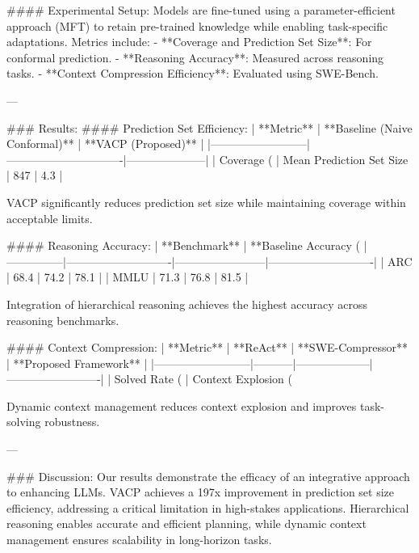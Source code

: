 #### Experimental Setup:
Models are fine-tuned using a parameter-efficient approach (MFT) to retain pre-trained knowledge while enabling task-specific adaptations. Metrics include:
- **Coverage and Prediction Set Size**: For conformal prediction.
- **Reasoning Accuracy**: Measured across reasoning tasks.
- **Context Compression Efficiency**: Evaluated using SWE-Bench.

---

### Results:
#### Prediction Set Efficiency:
| **Metric**               | **Baseline (Naive Conformal)** | **VACP (Proposed)** |
|--------------------------|-------------------------------|---------------------|
| Coverage (%
| Mean Prediction Set Size | 847                           | 4.3                |

VACP significantly reduces prediction set size while maintaining coverage within acceptable limits.

#### Reasoning Accuracy:
| **Benchmark** | **Baseline Accuracy (%
|---------------|----------------------------|------------------------|----------------------------|
| ARC           | 68.4                       | 74.2                   | 78.1                       |
| MMLU          | 71.3                       | 76.8                   | 81.5                       |

Integration of hierarchical reasoning achieves the highest accuracy across reasoning benchmarks.

#### Context Compression:
| **Metric**              | **ReAct** | **SWE-Compressor** | **Proposed Framework** |
|--------------------------|-----------|--------------------|-------------------------|
| Solved Rate (%
| Context Explosion (%

Dynamic context management reduces context explosion and improves task-solving robustness.

---

### Discussion:
Our results demonstrate the efficacy of an integrative approach to enhancing LLMs. VACP achieves a 197x improvement in prediction set size efficiency, addressing a critical limitation in high-stakes applications. Hierarchical reasoning enables accurate and efficient planning, while dynamic context management ensures scalability in long-horizon tasks.

